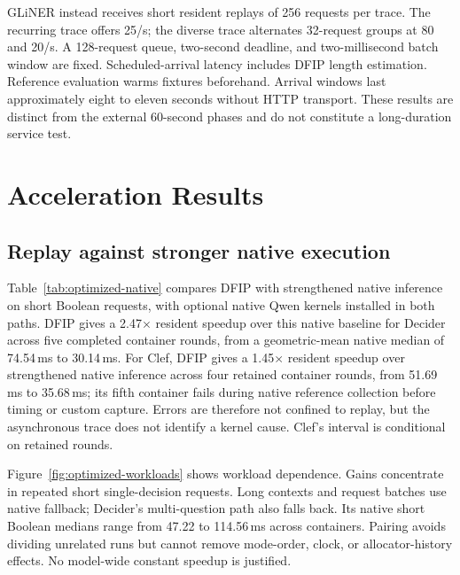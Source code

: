 \documentclass[10pt,twocolumn]{article}
\begin{document}
GLiNER instead receives short resident replays of 256 requests per trace. The recurring trace offers 25/s; the diverse trace alternates 32-request groups at 80 and 20/s. A 128-request queue, two-second deadline, and two-millisecond batch window are fixed. Scheduled-arrival latency includes DFIP length estimation. Reference evaluation warms fixtures beforehand. Arrival windows last approximately eight to eleven seconds without HTTP transport. These results are distinct from the external 60-second phases and do not constitute a long-duration service test.

\section{Acceleration Results}
\subsection{Replay against stronger native execution}
Table~\ref{tab:optimized-native} compares DFIP with strengthened native inference on short Boolean requests, with optional native Qwen kernels installed in both paths. DFIP gives a 2.47$\times$ resident speedup over this native baseline for Decider across five completed container rounds, from a geometric-mean native median of 74.54\,ms to 30.14\,ms. For Clef, DFIP gives a 1.45$\times$ resident speedup over strengthened native inference across four retained container rounds, from 51.69\,ms to 35.68\,ms; its fifth container fails during native reference collection before timing or custom capture. Errors are therefore not confined to replay, but the asynchronous trace does not identify a kernel cause. Clef's interval is conditional on retained rounds.

\begin{table}[t]
\centering\small

\caption{Short Boolean resident comparison with native CUDA convolution and FLA bindings installed. Speedup is strengthened-native median latency divided by DFIP median latency. Latencies are geometric means of within-container medians. Counts are completed/planned rounds; intervals bootstrap paired container medians.}
\label{tab:optimized-native}
\end{table}

Figure~\ref{fig:optimized-workloads} shows workload dependence. Gains concentrate in repeated short single-decision requests. Long contexts and request batches use native fallback; Decider's multi-question path also falls back. Its native short Boolean medians range from 47.22 to 114.56\,ms across containers. Pairing avoids dividing unrelated runs but cannot remove mode-order, clock, or allocator-history effects. No model-wide constant speedup is justified.
\end{document}
